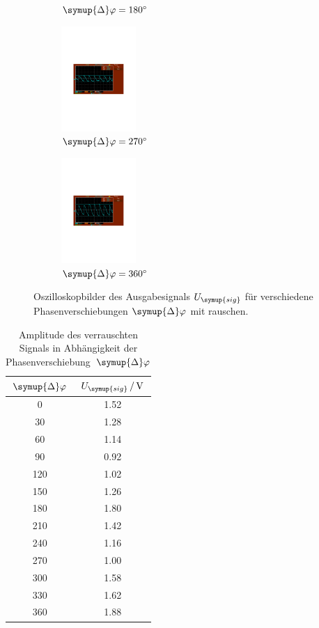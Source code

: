 \begin{figure}
\begin{subfigure}{0.48\textwidth}
    \caption{$\symup{\Delta}\varphi = \qty{180}{\degree}$}
  \end{subfigure}
  \begin{subfigure}{0.48\textwidth}
    \centering
    \includegraphics[height=4cm]{content/Bilder/verrauscht/270.pdf}
    \caption{$\symup{\Delta}\varphi = \qty{270}{\degree}$}
  \end{subfigure}
  \begin{subfigure}{0.48\textwidth}
    \centering
    \includegraphics[height=4cm]{content/Bilder/verrauscht/360.pdf}
    \caption{$\symup{\Delta}\varphi = \qty{360}{\degree}$}
  \end{subfigure}
  \caption{Oszilloskopbilder des Ausgabesignals $U_{\symup{sig}}$ für verschiedene Phasenverschiebungen $\symup{\Delta}\varphi$ mit rauschen.}
  \label{fig:Bilder rausch}
\end{figure}


\begin{table} [H]
  \centering
  \caption{Amplitude des verrauschten Signals in Abhängigkeit der Phasenverschiebung~$\symup{\Delta}\varphi$}
  \label{tab:verrauscht}
  \begin{tabular}{S[table-format=3.0] S[table-format=1.2]}
    \toprule
    {$\symup{\Delta}\varphi$} & {$U_{\symup{sig}}\,/\,\unit{\volt}$} \\
    	  & 1.52 \\
    30	& 1.28 \\
    60	& 1.14 \\
    90	& 0.92 \\
    120	& 1.02 \\
    150	& 1.26 \\
    180	& 1.80 \\
    210	& 1.42 \\
    240	& 1.16 \\
    270	& 1.00 \\
    300	& 1.58 \\
    330	& 1.62 \\
    360	& 1.88 \\
    \bottomrule
  \end{tabular}
\end{table}

